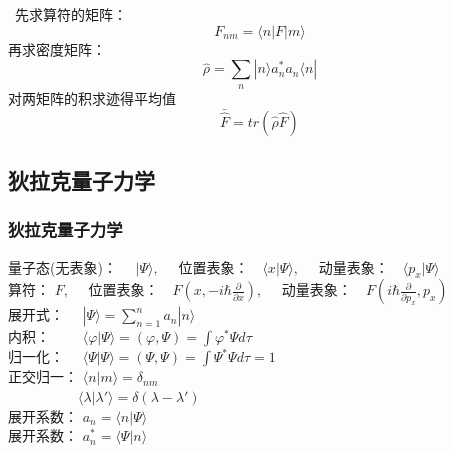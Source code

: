 \begin{frame}      
    \例[1.求算符$\hat{F}$在 $|\Psi\rangle =\sum\limits_n a_n |n\rangle $上的平均值]{}
    \解~先求算符的矩阵：
    $$ F_{nm} = \langle n | F |m \rangle  $$
    再求密度矩阵：
    $$ \hat{\rho} = \sum\limits_{n}| n \rangle  a_n ^* a_n \langle n | $$
    对两矩阵的积求迹得平均值
    $$\bar{\hat{F}}=tr (\hat{\rho} \hat{F} )$$
\end{frame} 
 
\subsection{狄拉克量子力学}

\begin{frame} 
    \frametitle{狄拉克量子力学}  
    量子态(无表象)： $\hspace{1em}|\Psi \rangle, \quad$ 位置表象：$\hspace{1em} \langle x |\Psi \rangle , \quad$ 动量表象：$\hspace{1em} \langle p_x |\Psi \rangle$ \\ \vspace{0.1em}
    算符： $F, \quad$ 位置表象：$\hspace{1em} F(x, -i\hbar \frac{\partial }{\partial x}) , \quad$ 动量表象：$\hspace{1em} F(i\hbar \frac{\partial }{\partial p_x}, p_x) $ \\ \vspace{0.1em}
    展开式： $\hspace{1em}|\Psi \rangle =\sum\limits_{n=1} ^n a_n |n \rangle$ \\
    内积：   $\hspace{2em}\langle \varphi | \Psi \rangle = (\varphi, \Psi)= \int \varphi^*\Psi d\tau $ \\  \vspace{0.1em}
    归一化： $\hspace{1em}\langle \Psi | \Psi \rangle = (\Psi, \Psi)= \int \Psi^*\Psi d\tau = 1 $ \\ \vspace{0.1em}
    正交归一： $\langle n | m \rangle = \delta_{nm} $ \\ \vspace{0.1em}
    $ \hspace{5em} \langle \lambda | \lambda' \rangle = \delta(\lambda-\lambda') $\\ \vspace{0.2em}
    展开系数： $ a_n= \langle n | \Psi \rangle$ \\ \vspace{0.2em}
    展开系数： $ a_n ^*= \langle \Psi | n \rangle$ \\ \vspace{0.2em}
\end{frame} 
 

